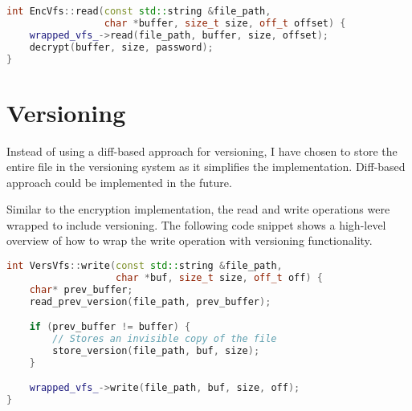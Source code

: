 \begin{lstlisting}[language=c++, basicstyle=\ttfamily\small, caption={Wrapping the read operation with encryption.}, label={lst:read}]
int EncVfs::read(const std::string &file_path,
                 char *buffer, size_t size, off_t offset) {
    wrapped_vfs_->read(file_path, buffer, size, offset);
    decrypt(buffer, size, password);
}
\end{lstlisting}



\section{Versioning}\label{sec:versioning2}

Instead of using a diff-based approach for versioning, I have chosen to store the entire file in the versioning system as it simplifies the implementation.
Diff-based approach could be implemented in the future.

Similar to the encryption implementation, the read and write operations were wrapped to include versioning.
The following code snippet shows a high-level overview of how to wrap the write operation with versioning functionality.

\begin{lstlisting}[language=c++, basicstyle=\ttfamily\small]
int VersVfs::write(const std::string &file_path,
                   char *buf, size_t size, off_t off) {
    char* prev_buffer;
    read_prev_version(file_path, prev_buffer);

    if (prev_buffer != buffer) {
        // Stores an invisible copy of the file
        store_version(file_path, buf, size);
    }

    wrapped_vfs_->write(file_path, buf, size, off);
}
\end{lstlisting}